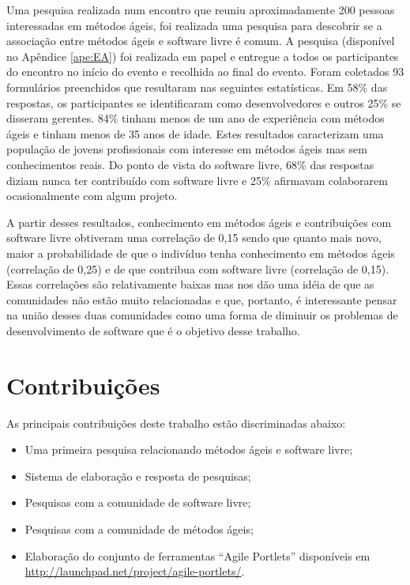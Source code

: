 Uma pesquisa realizada num encontro que reuniu aproximadamente 200
pessoas interessadas em métodos ágeis, foi realizada uma pesquisa para
descobrir se a associação entre métodos ágeis e software livre é
comum. A pesquisa (disponível no Apêndice \ref{ape:EA}) foi realizada
em papel e entregue a todos os participantes do encontro no início do
evento e recolhida ao final do evento. Foram coletados 93 formulários
preenchidos que resultaram nas seguintes estatísticas. Em 58\% das
respostas, os participantes se identificaram como desenvolvedores e
outros 25\% se disseram gerentes. 84\% tinham menos de um ano de
experiência com métodos ágeis e tinham menos de 35 anos de
idade. Estes resultados caracterizam uma população de jovens
profissionais com interesse em métodos ágeis mas sem conhecimentos
reais. Do ponto de vista do software livre, 68\% das respostas diziam
nunca ter contribuído com software livre e 25\% afirmavam colaborarem
ocasionalmente com algum projeto.

A partir desses resultados, conhecimento em métodos ágeis e
contribuições com software livre obtiveram uma correlação de 0,15
sendo que quanto mais novo, maior a probabilidade de que o indivíduo
tenha conhecimento em métodos ágeis (correlação de 0,25) e de que
contribua com software livre (correlação de 0,15). Essas correlações
são relativamente baixas mas nos dão uma idéia de que as comunidades
não estão muito relacionadas e que, portanto, é interessante pensar na
união desses duas comunidades como uma forma de diminuir os problemas
de desenvolvimento de software que é o objetivo desse trabalho.

\section{Contribuições}
\label{sec:contribucoes}

As principais contribuições deste trabalho estão discriminadas abaixo:

\begin{itemize}
\item Uma primeira pesquisa relacionando métodos ágeis e software livre;
\item Sistema de elaboração e resposta de pesquisas;
\item Pesquisas com a comunidade de software livre;
\item Pesquisas com a comunidade de métodos ágeis;
\item Elaboração do conjunto de ferramentas ``Agile Portlets''
  disponíveis em \url{http://launchpad.net/project/agile-portlets/}.
\end{itemize}

